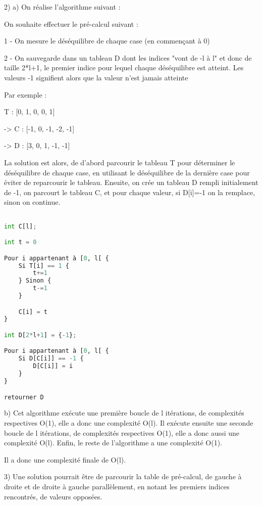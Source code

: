 \documentclass{article}
\begin{document}
2) a) On réalise l'algorithme suivant :

\bigskip

On souhaite effectuer le pré-calcul suivant :

1 - On mesure le déséquilibre de chaque case (en commençant à 0)

2 - On sauvegarde dans un tableau D dont les indices "vont de -l à l" et donc de taille 2*l+1, le premier indice pour lequel chaque déséquilibre est atteint. Les valeurs -1 signifient alors que la valeur n'est jamais atteinte

\bigskip

Par exemple :

\bigskip

   T : [0,  1,  0,  0,  1]

-> C : [-1, 0, -1, -2, -1]

-> D : [3, 0, 1, -1, -1]


La solution est alors, de d'abord parcourir le tableau T pour déterminer le déséquilibre de chaque case, en utilisant le déséquilibre de la dernière case pour éviter de reparcourir le tableau. Ensuite, on crée un tableau D rempli initialement de -1, on parcourt le tableau C, et pour chaque valeur, si D[i]=-1 on la remplace, sinon on continue.

\begin{lstlisting}[language=Python]

int C[l];

int t = 0

Pour i appartenant à [0, l[ {
    Si T[i] == 1 {
        t+=1
    } Sinon {
        t-=1
    }

    C[i] = t
}

int D[2*l+1] = {-1};

Pour i appartenant à [0, l[ {
    Si D[C[i]] == -1 {
        D[C[i]] = i
    }
}

retourner D
\end{lstlisting}

\bigskip
\bigskip

b) Cet algorithme exécute une première boucle de l itérations, de complexités respectives O(1), elle a donc une complexité O(l). Il exécute ensuite une seconde boucle de l itérations, de complexités respectives O(1), elle a donc aussi une complexité O(l). Enfin, le reste de l'algorithme a une complexité O(1).

Il a donc une complexité finale de O(l).

\bigskip
\bigskip

3) Une solution pourrait être de parcourir la table de pré-calcul, de gauche à droite et de droite à gauche parallèlement, en notant les premiers indices rencontrés, de valeurs opposées.
\end{document}
